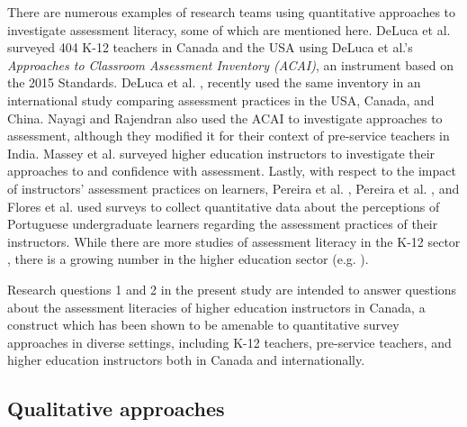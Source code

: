 \documentclass[
]{book}
\begin{document}
There are numerous examples of research teams using quantitative approaches to investigate assessment literacy, some of which are mentioned here. DeLuca et al. \citeyearpar{delucaTeachersApproachesClassroom2016} surveyed 404 K-12 teachers in Canada and the USA using DeLuca et al.'s \citeyearpar{delucaApproachesClassroomAssessment2016} \emph{Approaches to Classroom Assessment Inventory (ACAI)}, an instrument based on the 2015 Standards. DeLuca et al. \citeyearpar{delucaExploringAssessmentCultures2021}, recently used the same inventory in an international study comparing assessment practices in the USA, Canada, and China. Nayagi and Rajendran \citeyearpar{nayaginPreserviceTeachersApproaches2020} also used the ACAI to investigate approaches to assessment, although they modified it for their context of pre-service teachers in India. Massey et al. \citeyearpar{masseyAssessmentLiteracyCollege2020} surveyed higher education instructors to investigate their approaches to and confidence with assessment. Lastly, with respect to the impact of instructors' assessment practices on learners, Pereira et al. \citeyearpar{pereiraHowUndergraduatesPerceive2021}, Pereira et al. \citeyearpar{pereiraPerceptionsPortugueseUndergraduate2017}, and Flores et al. \citeyearpar{floresPerceptionsEffectivenessFairness2015} used surveys to collect quantitative data about the perceptions of Portuguese undergraduate learners regarding the assessment practices of their instructors. While there are more studies of assessment literacy in the K-12 sector \citep{medlandAssessmentIlliterateShared2019}, there is a growing number in the higher education sector (e.g. \citep{masseyAssessmentLiteracyCollege2020, nayaginPreserviceTeachersApproaches2020, pereiraHowUndergraduatesPerceive2021}).

Research questions 1 and 2 in the present study are intended to answer questions about the assessment literacies of higher education instructors in Canada, a construct which has been shown to be amenable to quantitative survey approaches in diverse settings, including K-12 teachers, pre-service teachers, and higher education instructors both in Canada and internationally.

\hypertarget{qualitative-approaches}{%
\subsection*{Qualitative approaches}\label{qualitative-approaches}}
\end{document}
